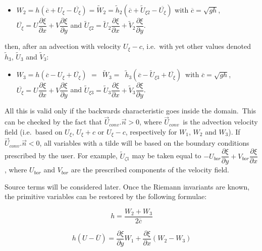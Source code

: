 \begin{itemize}
\item $W_{2}=h(\overline{c}+U_{\xi }-\overline{U_{\xi }})=\widetilde{W}%
_{2}=\widetilde{h}_{2}(\overline{c}+\widetilde{U}_{\xi 2}-\overline{U_{\xi
}})$ with $\overline{c}=\sqrt{gh}$, $\overline{U_{\xi }}=U\dfrac{\partial
\xi }{\partial x}+V\dfrac{\partial \xi }{\partial y}$ and $\widetilde{U}%
_{\xi 2}=\widetilde{U}_{2}\dfrac{\partial \xi }{\partial x}+\widetilde{V}%
_{2}\dfrac{\partial \xi }{\partial y}$.
\end{itemize}

then, after an advection with velocity $U_{\xi }-c$, i.e.\ with yet other
values denoted $\widetilde{h}_{3}$, $\widetilde{U}_{3}$ and $\widetilde{V}%
_{3}$:

\begin{itemize}
\item $W_{3}=h(\overline{c}-U_{\xi }+\overline{U_{\xi }})$ $=$\ $%
\widetilde{W}_{3}=$\ $\widetilde{h}_{3}(\overline{c}-\widetilde{U}_{\xi 3}+%
\overline{U_{\xi }})$\ with $\overline{c}=\sqrt{gh}$, $\overline{U_{\xi }}%
=U\dfrac{\partial \xi }{\partial x}+V\dfrac{\partial \xi }{\partial y}$ and $%
\widetilde{U}_{\xi 3}=\widetilde{U}_{3}\dfrac{\partial \xi }{\partial x}+%
\widetilde{V}_{3}\dfrac{\partial \xi }{\partial y}$.
\end{itemize}

All this is valid only if the backwards characteristic goes inside the
domain.\ This can be checked by the fact that $\vec{U}_{conv}.%
\vec{n}>0$, where $\vec{U}_{conv}$\ is the advection
velocity field (i.e.\ based on $U_{\xi }$, $U_{\xi }+c$ or $U_{\xi }-c$,
respectively for $W_{1}$, $W_{2}$ and $W_{3}$). If $\vec{U}%
_{conv}.\vec{n}<0$, all variables with a tilde will be based on
the boundary conditions prescribed by the user. For example, $\widetilde{U}%
_{\zeta 1}$ may be taken equal to $-U_{bor}\dfrac{\partial \xi }{\partial y}%
+V_{bor}\dfrac{\partial \xi }{\partial x}$, where $U_{bor}$ and $V_{bor}$
are the prescribed components of the velocity field.

Source terms will be considered later. Once the Riemann invariants are
known, the primitive variables can be restored by the following formulae:

\begin{equation}
h=\dfrac{W_{2}+W_{3}}{2\overline{c}}  \label{equ1}
\end{equation}

\begin{equation}
h(U-\overline{U})=\dfrac{\partial \xi }{\partial y}W_{1}+\dfrac{\partial \xi 
}{\partial x}(W_{2}-W_{3})  \label{equ2}
\end{equation}

